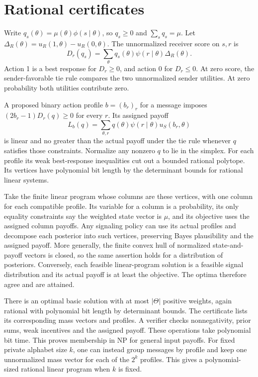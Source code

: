 \documentclass[11pt,a4paper]{amsart}
\begin{document}
\section{Rational certificates}

Write \(q_s(\theta)=\mu(\theta)\phi(s\mid\theta)\), so \(q_s\geq0\)
and \(\sum_s q_s=\mu\).
Let \(\Delta_R(\theta)=u_R(1,\theta)-u_R(0,\theta)\).
The unnormalized receiver score on \(s,r\) is
\[
 D_r(q_s)=\sum_\theta q_s(\theta)\psi(r\mid\theta)\Delta_R(\theta).
\]
Action 1 is a best response for \(D_r\geq0\), and action 0 for
\(D_r\leq0\). At zero score, the sender-favorable tie rule compares
the two unnormalized sender utilities. At zero probability both
utilities contribute zero.

A proposed binary action profile \(b=(b_r)_r\) for a message imposes
\((2b_r-1)D_r(q)\geq0\) for every \(r\). Its assigned payoff
\[
 L_b(q)=\sum_{\theta,r}q(\theta)\psi(r\mid\theta)u_S(b_r,\theta)
\]
is linear and no greater than the actual payoff under the
tie rule whenever \(q\) satisfies those constraints.
Normalize any nonzero \(q\) to lie in the simplex. For each profile
its weak best-response inequalities cut out a bounded rational
polytope. Its vertices have polynomial bit length by the
determinant bounds for rational linear systems.

Take the finite linear program whose columns are these vertices,
with one column for each compatible profile. Its variable for a
column is a probability, its only equality constraints say the
weighted state vector is \(\mu\), and its objective uses the
assigned column payoffs. Any signaling policy can use its actual
profiles and decompose each posterior into such vertices, preserving
Bayes plausibility and the assigned payoff. More generally, the finite
convex hull of normalized state-and-payoff vectors is closed,
so the same assertion holds for a distribution of posteriors.
Conversely, each feasible linear-program solution is a feasible
signal distribution and its actual payoff is at least the objective.
The optima therefore agree and are attained.

There is an optimal basic solution with at most \(|\Theta|\) positive
weights, again rational with polynomial bit length by determinant
bounds. The certificate lists its corresponding mass vectors and
profiles. A verifier checks nonnegativity, prior sums, weak
incentives and the assigned payoff. These operations take polynomial
bit time. This proves membership in NP for general input payoffs.
For fixed private alphabet size \(k\), one can instead group messages
by profile and keep one unnormalized mass vector for each of the
\(2^k\) profiles. This gives a polynomial-sized rational linear
program when \(k\) is fixed.
\end{document}
